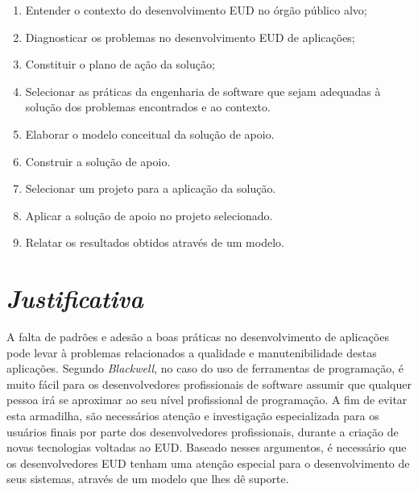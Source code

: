 \begin{enumerate}
	\item Entender o contexto do desenvolvimento EUD no órgão público alvo;
	\item Diagnosticar os problemas no desenvolvimento EUD de aplicações;
	\item Constituir o plano de ação da solução;


	\item Selecionar as práticas da engenharia de software que sejam adequadas à solução dos problemas encontrados e ao contexto.
	\item Elaborar o modelo conceitual da solução de apoio.
	\item Construir a solução de apoio.
	\item Selecionar um projeto para a aplicação da solução.
	\item Aplicar a solução de apoio no projeto selecionado.
	\item Relatar os resultados obtidos através de um modelo.
\end{enumerate}

\section{\textit{Justificativa}}

A falta de padrões e adesão a boas práticas no desenvolvimento de aplicações pode levar à problemas relacionados a qualidade e manutenibilidade destas aplicações. Segundo \textit{Blackwell}, no caso do uso de ferramentas de programação, é muito fácil para os desenvolvedores profissionais de software assumir que qualquer pessoa irá se aproximar ao seu nível profissional de programação. A fim de evitar esta armadilha, são necessários atenção e investigação especializada para os usuários finais por parte dos desenvolvedores profissionais, durante a criação de novas tecnologias voltadas ao EUD. Baseado nesses argumentos, é necessário que os desenvolvedores EUD tenham uma atenção especial para o desenvolvimento de seus sistemas, através de um modelo que lhes dê suporte.


